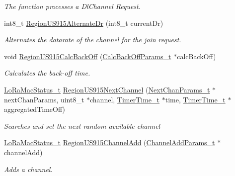 \begin{DoxyCompactItemize}
\begin{DoxyCompactList}\small\item\em The function processes a Dl\+Channel Request. \end{DoxyCompactList}\item 
int8\+\_\+t \mbox{\hyperlink{group___r_e_g_i_o_n_u_s915_gad0a015a1b8157a3806d982cbf7249720}{Region\+U\+S915\+Alternate\+Dr}} (int8\+\_\+t current\+Dr)
\begin{DoxyCompactList}\small\item\em Alternates the datarate of the channel for the join request. \end{DoxyCompactList}\item 
void \mbox{\hyperlink{group___r_e_g_i_o_n_u_s915_ga134edad7c2c6d4c2a063b08b6358b8be}{Region\+U\+S915\+Calc\+Back\+Off}} (\mbox{\hyperlink{group___r_e_g_i_o_n_ga7c5c9a8da174e6679eded8257dc92fd9}{Calc\+Back\+Off\+Params\+\_\+t}} $\ast$calc\+Back\+Off)
\begin{DoxyCompactList}\small\item\em Calculates the back-\/off time. \end{DoxyCompactList}\item 
\mbox{\hyperlink{group___l_o_r_a_m_a_c_ga30bd25657e10480f8605ee951b0ecfbd}{Lo\+Ra\+Mac\+Status\+\_\+t}} \mbox{\hyperlink{group___r_e_g_i_o_n_u_s915_gaaafa99a7ad8bc41de908155b5d73f32f}{Region\+U\+S915\+Next\+Channel}} (\mbox{\hyperlink{group___r_e_g_i_o_n_ga115f5e83afae352c0a3dcdc193374040}{Next\+Chan\+Params\+\_\+t}} $\ast$next\+Chan\+Params, uint8\+\_\+t $\ast$channel, \mbox{\hyperlink{utilities_8h_a4215ca43d3e953099ea758ce428599d0}{Timer\+Time\+\_\+t}} $\ast$time, \mbox{\hyperlink{utilities_8h_a4215ca43d3e953099ea758ce428599d0}{Timer\+Time\+\_\+t}} $\ast$aggregated\+Time\+Off)
\begin{DoxyCompactList}\small\item\em Searches and set the next random available channel \end{DoxyCompactList}\item 
\mbox{\hyperlink{group___l_o_r_a_m_a_c_ga30bd25657e10480f8605ee951b0ecfbd}{Lo\+Ra\+Mac\+Status\+\_\+t}} \mbox{\hyperlink{group___r_e_g_i_o_n_u_s915_gad085905909fed76b2b7355aa2e22e1f7}{Region\+U\+S915\+Channel\+Add}} (\mbox{\hyperlink{group___r_e_g_i_o_n_gab1c5f3aa06614283202906cef4417860}{Channel\+Add\+Params\+\_\+t}} $\ast$channel\+Add)
\begin{DoxyCompactList}\small\item\em Adds a channel. \end{DoxyCompactList}\item 

\end{DoxyCompactItemize}
